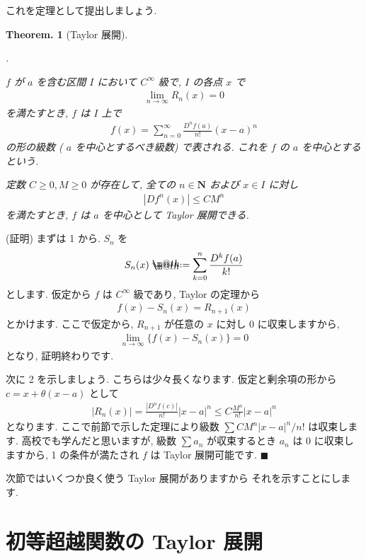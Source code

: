 \documentclass[openany, a4paper, oneside]{book}
\makeatletter
\newcounter{enum2}
\renewenvironment{enumerate}{%
\begin{list}%
{%
\arabic{enum2}.\ \,%
}%
{%
\usecounter{enum2}
\setlength{\itemindent}{0pt}%
\setlength{\leftmargin}{6pt}%
\setlength{\rightmargin}{0pt}%
\setlength{\labelsep}{0pt}%
\setlength{\labelwidth}{6pt}%
\setlength{\itemsep}{0pt}%
\setlength{\parsep}{0pt}%
\setlength{\listparindent}{0pt}%
}
}{%
\end{list}%
}
\newcommand*{\defeq}{\mathrel{\rlap{%
\raisebox{0.3ex}{$\m@th\cdot$}}%
\raisebox{-0.3ex}{$\m@th\cdot$}}%
=}
\theoremstyle{break}
\newtheorem{thm}{Theorem.}[section]
\theoremstyle{breakdefn}
\newcommand{\abs}[1]{\left|#1\right|}
\makeatother
\begin{document}
これを定理として提出しましょう.
\begin{thm}[Taylor 展開]
 \begin{enumerate}
  \item $f$ が $a$ を含む区間 $I$ において $C^{\infty}$ 級で,  $I$ の各点 $x$ で
   \begin{align}
    \lim_{n \to \infty}R_n (x)=0
   \end{align}
   を満たすとき,  $f$ は $I$ 上で
   \begin{align}
    f (x)
    =
    \sum_{n=0}^{\infty}\frac{D^nf (a)}{n!}(x-a)^n
   \end{align}
   の形の級数 ( $a$ を中心とするべき級数) で表される.
   これを $f$ の $a$ を中心とするという.
  \item 定数 $C\geq 0,M\geq 0$ が存在して, 全ての $n \in \bm{N}$ および
   $x\in I$ に対し
   \begin{align}
   \abs{Df^n (x)}\leq CM^n
   \end{align}
   を満たすとき,  $f$ は $a$ を中心として Taylor 展開できる.
 \end{enumerate}
\end{thm}
(証明) まずは 1 から.  $S_n$ を
    \begin{align}
        S_n (x)\defeq \sum_{k=0}^n \frac{D^kf (a)}{k!}
    \end{align}
とします. 仮定から $f$ は $C^{\infty}$ 級であり, Taylor の定理から
    \begin{align}
        f (x)-S_n (x)=R_{n+1}(x)
    \end{align}
とかけます. ここで仮定から,  $R_{n+1}$ が任意の $x$ に対し $0$ に収束しますから,
    \begin{align}
        \lim_{n \to \infty}\{ f (x)-S_n (x) \} =0
    \end{align}
となり, 証明終わりです.

次に 2 を示しましょう. こちらは少々長くなります.
仮定と剰余項の形から $c=x+\theta (x-a)$ として
    \begin{align}
        |R_n (x)|=\frac{|D^nf (c)|}{n!}|x-a|^n \leq C\frac{M^n}{n!}|x-a|^n
    \end{align}
となります. ここで前節で示した定理により級数
 $\sum CM^n|x-a|^n/n!$ は収束します.
高校でも学んだと思いますが,
級数 $\sum a_n$ が収束するとき $a_n$ は 0 に収束しますから, 1 の条件が満たされ
 $f$ は Taylor 展開可能です.  $\blacksquare$

次節ではいくつか良く使う Taylor 展開がありますから
それを示すことにします.
\section{初等超越関数の Taylor 展開}
\label{sec-5-2-4}
\end{document}
